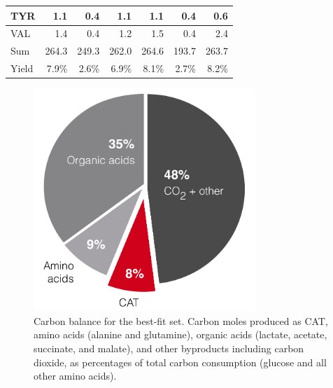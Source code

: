 \documentclass[12pt]{article}
\begin{document}
\begin{table}
\begin{tabular}{lrrrrrr}
        TYR & 1.1 & 0.4 & 1.1 & 1.1 & 0.4 & 0.6 \\ \hline
        VAL & 1.4 & 0.4 & 1.2 & 1.5 & 0.4 & 2.4 \\ \midrule
        Sum & 264.3 & 249.3 & 262.0 & 264.6 & 193.7 & 263.7 \\ \midrule
        Yield & 7.9\% & 2.6\% & 6.9\% & 8.1\% & 2.7\% & 8.2\% \\ \bottomrule
    \end{tabular}
\label{tbl:yield_breakdown}
\end{table}

\begin{figure}[ht]
\centering
\includegraphics[width=0.75\textwidth]{./Figures/Carbon-Balance-BFS.pdf}
\caption{Carbon balance for the best-fit set. Carbon moles produced as CAT, amino acids (alanine and glutamine), organic acids (lactate, acetate, succinate, and malate), and other byproducts including carbon dioxide, as percentages of total carbon consumption (glucose and all other amino acids).}
\label{fig:Carbon_Balance}
\end{figure}
\end{document}

